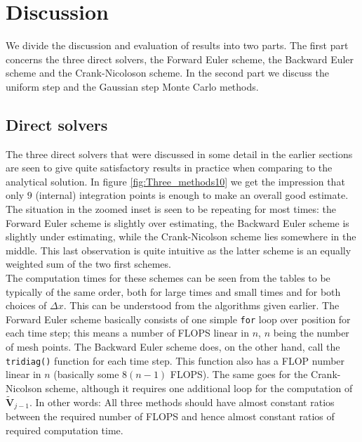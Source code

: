\documentclass[a4paper, 11pt, notitlepage,english]{article}
\begin{document}
\section{Discussion}
\label{sec:Discuss}
We divide the discussion and evaluation of results into two parts. The first part concerns the three direct solvers, the Forward Euler scheme, the Backward Euler scheme and the Crank-Nicoloson scheme. In the second part we discuss the uniform step and the Gaussian step Monte Carlo methods.

\subsection{Direct solvers}
The three direct solvers that were discussed in some detail in the earlier sections are seen to give quite satisfactory results in practice when comparing to the analytical 
solution. In figure \ref{fig:Three_methods10} we get the impression that only $9$ (internal) integration points is enough to make an overall good estimate. The situation in 
the zoomed inset is seen to be repeating for most times: the Forward Euler scheme is slightly over estimating, the Backward Euler scheme is slightly under estimating, while 
the Crank-Nicolson scheme lies somewhere in the middle. This last observation is quite intuitive as the latter scheme is an equally weighted sum of the two first schemes. \\

The computation times for these schemes can be seen from the tables to be typically of the same order, both for large times and small times and for both choices of $\Delta x$.
This can be understood from the algorithms given earlier. The Forward Euler scheme basically consists of one simple \texttt{for} loop over position for each time step; this 
means a number of FLOPS linear in $n$, $n$ being the number of mesh points. The Backward Euler scheme does, on the other hand, call the \texttt{tridiag()} function for each time 
step. This function also has a FLOP number linear in $n$ (basically some $8(n-1)$ FLOPS). The same goes for the Crank-Nicolson scheme, although it requires one additional loop 
for the computation of $\tilde{\boldsymbol{V}}_{j-1}$. In other words: All three methods should have almost constant ratios between the required number of FLOPS and hence almost
constant ratios of required computation time. \\
\end{document}
